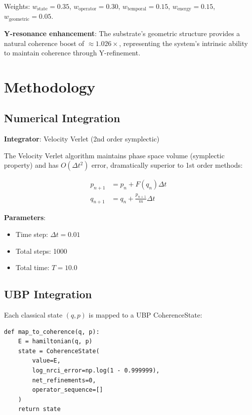 \documentclass[11pt,a4paper]{article}
\begin{document}
Weights: $w_{\text{state}} = 0.35$, $w_{\text{operator}} = 0.30$, $w_{\text{temporal}} = 0.15$, $w_{\text{energy}} = 0.15$, $w_{\text{geometric}} = 0.05$.

\textbf{Y-resonance enhancement}: The substrate's geometric structure provides a natural coherence boost of $\approx 1.026\times$, representing the system's intrinsic ability to maintain coherence through Y-refinement.

\section{Methodology}

\subsection{Numerical Integration}

\textbf{Integrator}: Velocity Verlet (2nd order symplectic)

The Velocity Verlet algorithm maintains phase space volume (symplectic property) and has $O(\Delta t^2)$ error, dramatically superior to 1st order methods:

\begin{align}
p_{n+1} &= p_n + F(q_n) \Delta t \\
q_{n+1} &= q_n + \frac{p_{n+1}}{m} \Delta t
\end{align}

\textbf{Parameters}:
\begin{itemize}
    \item Time step: $\Delta t = 0.01$
    \item Total steps: 1000
    \item Total time: $T = 10.0$
\end{itemize}

\subsection{UBP Integration}

Each classical state $(q, p)$ is mapped to a UBP CoherenceState:

\begin{lstlisting}[caption={Mapping classical states to UBP substrate}]
def map_to_coherence(q, p):
    E = hamiltonian(q, p)
    state = CoherenceState(
        value=E,
        log_nrci_error=np.log(1 - 0.999999),
        net_refinements=0,
        operator_sequence=[]
    )
    return state
\end{lstlisting}
\end{document}
